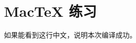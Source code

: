 \documentclass[UTF8,fontset=fandol]{ctexart}
\begin{document}
\section*{MacTeX 练习}
如果能看到这行中文，说明本次编译成功。
\end{document}
